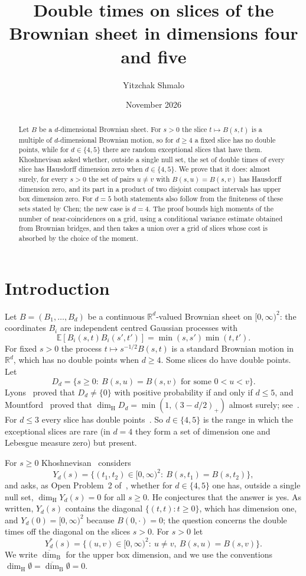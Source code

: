 \documentclass[11pt]{amsart}
\title[Double times on slices of the Brownian sheet]{Double times on slices of the Brownian sheet in dimensions four and five}
\author{Yitzchak Shmalo}
\date{November 2026}
\theoremstyle{remark}
\newcommand{\R}{\mathbb{R}}
\newcommand{\E}{\mathbb{E}}
\newcommand{\dimH}{\dim_{\mathrm H}}
\newcommand{\dimB}{\overline{\dim}_{\mathrm B}}
\begin{document}
\begin{abstract}
Let $B$ be a $d$-dimensional Brownian sheet. For $s>0$ the slice $t\mapsto B(s,t)$ is a multiple of $d$-dimensional
Brownian motion, so for $d\ge4$ a fixed slice has no double points, while for $d\in\{4,5\}$ there are random exceptional
slices that have them. Khoshnevisan asked whether, outside a single null set, the set of double times of every slice has
Hausdorff dimension zero when $d\in\{4,5\}$. We prove that it does: almost surely, for every $s>0$ the set of pairs
$u\ne v$ with $B(s,u)=B(s,v)$ has Hausdorff dimension zero, and its part in a product of two disjoint compact intervals
has upper box dimension zero. For $d=5$ both statements also follow from the finiteness of these sets stated by Chen;
the new case is $d=4$. The proof bounds high moments of the number of near-coincidences on a grid, using a
conditional variance estimate obtained from Brownian bridges, and then takes a union over a grid of slices whose cost is
absorbed by the choice of the moment.
\end{abstract}
\maketitle

\section{Introduction}\label{sec:intro}

Let $B=(B_1,\dots,B_d)$ be a continuous $\R^d$-valued Brownian sheet on $[0,\infty)^2$: the coordinates $B_i$ are
independent centred Gaussian processes with
\[
\E[B_i(s,t)B_i(s',t')]=\min(s,s')\min(t,t').
\]
For fixed $s>0$ the process $t\mapsto s^{-1/2}B(s,t)$ is a standard Brownian motion in $\R^d$, which has no double
points when $d\ge4$. Some slices do have double points. Let
\[
D_d=\{s\ge0:\ B(s,u)=B(s,v)\text{ for some }0<u<v\}.
\]
Lyons~\cite{Lyo86} proved that $D_d\ne\{0\}$ with positive probability if and only if $d\le5$, and Mountford~\cite{Mou90}
proved that $\dimH D_d=\min(1,(3-d/2)_+)$ almost surely; see~\cite[(1.10) and (1.12)]{Kho05}. For $d\le3$ every slice
has double points~\cite{Pen89,Pen90}. So $d\in\{4,5\}$ is the range in which the exceptional slices are rare (in
$d=4$ they form a set of dimension one and Lebesgue measure zero) but present.

For $s\ge0$ Khoshnevisan~\cite[(8.2)]{Kho05} considers
\[
Y_d(s)=\{(t_1,t_2)\in[0,\infty)^2:\ B(s,t_1)=B(s,t_2)\},
\]
and asks, as Open Problem~2 of~\cite[Section~8.2]{Kho05}, whether for $d\in\{4,5\}$ one has, outside a single null set,
$\dimH Y_d(s)=0$ for all $s\ge0$. He conjectures that the answer is yes. As written, $Y_d(s)$ contains the diagonal
$\{(t,t):t\ge0\}$, which has dimension one, and $Y_d(0)=[0,\infty)^2$ because $B(0,\cdot)=0$; the question concerns the
double times off the diagonal on the slices $s>0$. For $s>0$ let
\begin{equation}\label{eq:Ystar}
Y^*_d(s)=\{(u,v)\in[0,\infty)^2:\ u\ne v,\ B(s,u)=B(s,v)\}.
\end{equation}
We write $\dimB$ for the upper box dimension, and we use the conventions $\dimH\emptyset=\dimB\emptyset=0$.
\end{document}
